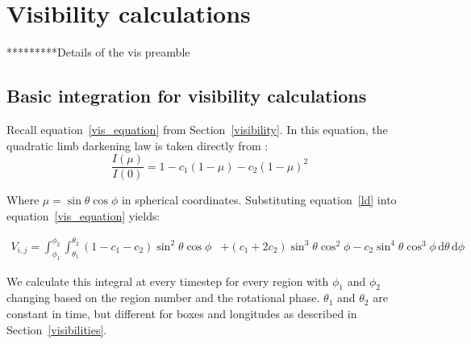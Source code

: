 \appendix

\section{Visibility calculations \label{vis_appendix}}
*********Details of the vis preamble

\subsection{Basic integration for visibility calculations}
Recall equation~\ref{vis_equation} from Section~\ref{visibility}. In this equation, the quadratic limb darkening law is taken directly from \citet{Claret2004}:
\begin{equation}
   \frac{I(\mu)}{I(0)} = 1 - c_1 (1 - \mu) - c_2 (1 - \mu)^2
\end{equation}

Where $\mu = \sin\theta\cos\phi$ in spherical coordinates. Substituting equation~\ref{ld} into equation~\ref{vis_equation} yields:

\begin{equation}
\begin{split}
    V_{i,j} = \int_{\phi_1}^{\phi_2}  \int_{\theta_1}^{\theta_2} (1 - c_1 - c_2) \sin^2 \theta \cos \phi &+ (c_1 + 2 c_2) \sin^3 \theta \cos^2 \phi - c_2 \sin^4 \theta \cos^3 \phi \,\mathrm{d}\theta \, \mathrm{d}\phi
\end{split}
\end{equation}

We calculate this integral at every timestep for every region with $\phi_1$ and $\phi_2$ changing based on the region number and the rotational phase. $\theta_1$ and $\theta_2$ are constant in time, but different for boxes and longitudes as described in Section~\ref{visibilities}.

%
%
%
%

